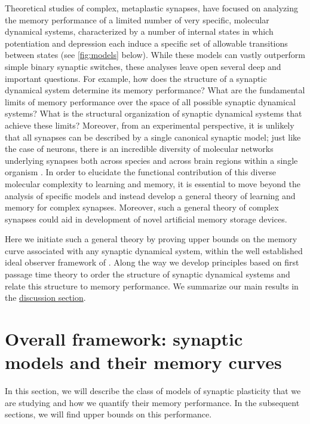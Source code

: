 \documentclass{article} %
\begin{document}
Theoretical studies of complex, metaplastic synapses, have focused on analyzing the memory performance of a limited number of very specific, molecular dynamical systems, characterized by a number of internal states in which potentiation and depression each induce a specific set of allowable transitions between states (\eg see \autoref{fig:models} below).
While these models can vastly outperform simple binary synaptic switches, these analyses leave open several deep and important questions.
For example, how does the structure of a synaptic dynamical system determine its memory performance?  What are the fundamental limits of memory performance over the space of all possible synaptic dynamical systems?
What is the structural organization of synaptic dynamical systems that achieve these limits?
Moreover, from an experimental perspective, it is unlikely that all synapses can be described by a single canonical synaptic model;  just like the case of neurons, there is an incredible diversity of molecular networks underlying synapses both across species and across brain regions within a single organism \cite{Emes2012synapserev}.
In order to elucidate the functional contribution of this diverse molecular complexity to learning and memory, it is essential to move beyond the analysis of specific models and instead develop a general theory of learning and memory for complex synapses.
Moreover, such a general theory of complex synapses could aid in development of novel artificial memory storage devices.  %

Here we initiate such a general theory by proving upper bounds on the memory curve associated with any synaptic dynamical system, within the well established ideal
observer framework of \cite{Fusi2005cascade,Fusi2007multistate,Barrett2008discrete}.
Along the way we develop principles based on first passage time theory to order the structure of synaptic dynamical systems and relate this structure to memory performance.
We summarize our main results in the \hyperref[sec:disc]{discussion section}.





\section{Overall framework: synaptic models and their memory curves}\label{sec:setup}

In this section, we will describe the class of models of synaptic plasticity that we are studying and how we quantify their memory performance.
In the subsequent sections, we will find upper bounds on this performance.
\end{document}
